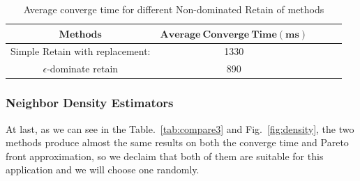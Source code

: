 \documentclass[11pt, runningheads,a4paper]{llncs}
\begin{document}
\begin{table}
  \caption {Average converge time for different Non-dominated Retain of methods}  
  \label{tab:compare2}
    \begin{center}
\begin{tabular}{c|cccc} 
\toprule 
	$\mathbf{Methods}$   & $\mathbf{Average\ Converge\ Time (ms)}$\\
	\hline Simple Retain with replacement: &  1330 \\ 
         $\epsilon$-dominate retain & 890 \\
\bottomrule 
\end{tabular} 
\end{center}
\end{table}


\subsubsection{Neighbor Density Estimators}
At last, as we can see in the Table.~\ref{tab:compare3} and Fig.~\ref{fig:density}, the two methods produce almost the same results on both the converge time and Pareto front approximation, so we declaim that both of them are suitable for this application and we will choose one randomly.
\end{document}
